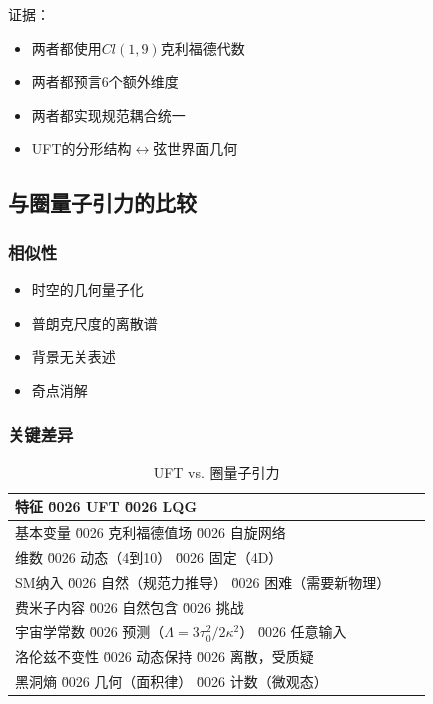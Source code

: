 证据：
\begin{itemize}
    \item 两者都使用$Cl(1,9)$克利福德代数
    \item 两者都预言6个额外维度
    \item 两者都实现规范耦合统一
    \item UFT的分形结构$\leftrightarrow$弦世界面几何
\end{itemize}

\subsection{与圈量子引力的比较}

\subsubsection{相似性}

\begin{itemize}
    \item 时空的几何量子化
    \item 普朗克尺度的离散谱
    \item 背景无关表述
    \item 奇点消解
\end{itemize}

\subsubsection{关键差异}

\begin{table}[htbp]
\centering
\caption{UFT vs. 圈量子引力}
\begin{tabular}{@{}lcc@{}}
\toprule
\textbf{特征} \u0026 \textbf{UFT} \u0026 \textbf{LQG} \\
\midrule
基本变量 \u0026 克利福德值场 \u0026 自旋网络 \\
维数 \u0026 动态（4到10） \u0026 固定（4D） \\
SM纳入 \u0026 自然（规范力推导） \u0026 困难（需要新物理） \\
费米子内容 \u0026 自然包含 \u0026 挑战 \\
宇宙学常数 \u0026 预测（$\Lambda = 3\tau_0^2/2\kappa^2$） \u0026 任意输入 \\
洛伦兹不变性 \u0026 动态保持 \u0026 离散，受质疑 \\
黑洞熵 \u0026 几何（面积律） \u0026 计数（微观态） \\
\bottomrule
\end{tabular}
\label{tab:lqg_comparison}
\end{table}

